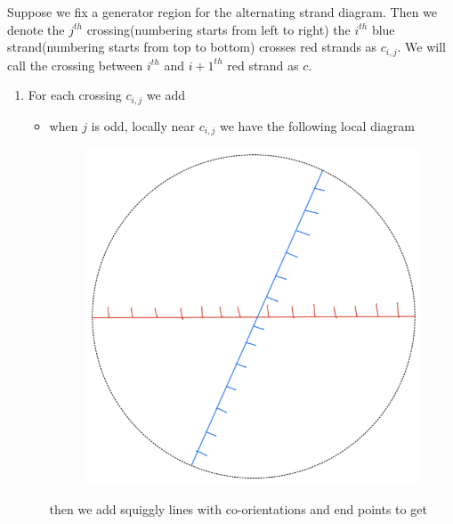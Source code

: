\begin{definition}
Suppose we fix a generator region for the alternating strand diagram. Then we denote the $j^{th}$ crossing(numbering starts from left to right) the $i^{th}$ blue strand(numbering starts from top to bottom) crosses red strands as $c_{i,j}$. We will call the crossing between $i^{th}$ and $i+1^{th}$ red strand as $c$.
\begin{enumerate}[label = (\roman*)]
\item For each crossing $c_{i,j}$ we add 
\begin{itemize}
\item when $j$ is odd, locally near $c_{i,j}$ we have the following local diagram
\begin{figure}[H] 
    \centering
    \includegraphics[scale = 0.95]{diagrams/local_systems_on_as_diagrams/3.png} 
    \caption{}
    \label{fig:your-label}
\end{figure}
then we add squiggly lines with co-orientations and end points to get
\begin{figure}[H] 
    \centering

\end{figure}
\end{itemize}
\end{enumerate}
\end{definition}
